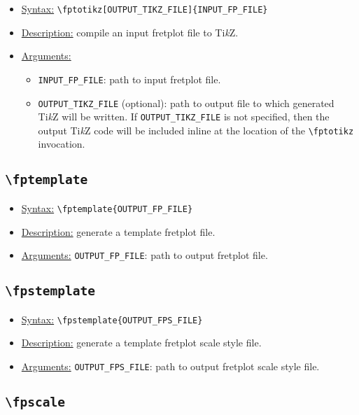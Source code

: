 \documentclass[12pt,letterpaper]{article}
\begin{document}
\begin{itemize}
  \item[] \uline{Syntax:} \texttt{\textbackslash fptotikz[OUTPUT\_TIKZ\_FILE]\{INPUT\_FP\_FILE\}}
  \item[] \uline{Description:} compile an input fretplot file to Ti\textit{k}Z.
  \item[] \uline{Arguments:}
    \begin{itemize}
      \item \texttt{INPUT\_FP\_FILE}: path to input fretplot file.
      \item \texttt{OUTPUT\_TIKZ\_FILE} (optional): path to output file to which generated Ti\textit{k}Z will be written. If \texttt{OUTPUT\_TIKZ\_FILE} is not specified, then the output Ti\textit{k}Z code will be included inline at the location of the \texttt{\textbackslash fptotikz} invocation.
    \end{itemize}
\end{itemize}

\subsection{\texttt{\textbackslash fptemplate}}

\begin{itemize}
  \item[] \uline{Syntax:} \texttt{\textbackslash fptemplate\{OUTPUT\_FP\_FILE\}}
  \item[] \uline{Description:} generate a template fretplot file.
  \item[] \uline{Arguments:} \texttt{OUTPUT\_FP\_FILE}: path to output fretplot file.
\end{itemize}

\subsection{\texttt{\textbackslash fpstemplate}}

\begin{itemize}
  \item[] \uline{Syntax:} \texttt{\textbackslash fpstemplate\{OUTPUT\_FPS\_FILE\}}
  \item[] \uline{Description:} generate a template fretplot scale style file.
  \item[] \uline{Arguments:} \texttt{OUTPUT\_FPS\_FILE}: path to output fretplot scale style file.
\end{itemize}

\subsection{\texttt{\textbackslash fpscale}}
\end{document}
